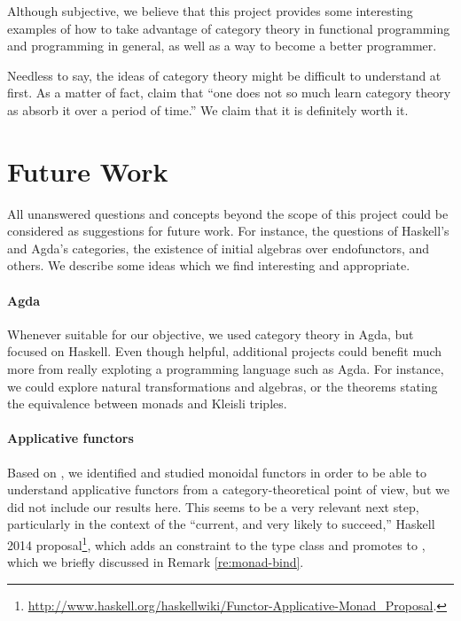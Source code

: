 Although subjective, we believe that this project provides some
interesting examples of how to take advantage of category theory in
functional programming and programming in general, as well as a way to
become a better programmer.

Needless to say, the ideas of category theory might be difficult to
understand at first. As a matter of fact,
\textcite[25]{bird-demoor-1997} claim that ``one does not so much
learn category theory as absorb it over a period of time.'' We claim
that it is definitely worth it.

\section{Future Work}

All unanswered questions and concepts beyond the scope of this project
could be considered as suggestions for future work. For instance, the
questions of Haskell's and Agda's categories, the existence of initial
algebras over endofunctors, and others. We describe some ideas which
we find interesting and appropriate.

\paragraph{Agda}

Whenever suitable for our objective, we used category theory in Agda,
but focused on Haskell. Even though helpful, additional projects could
benefit much more from really exploting a programming language such as
Agda. For instance, we could explore natural transformations and
algebras, or the theorems stating the equivalence between monads and
Kleisli triples.

\paragraph{Applicative functors}

Based on \parencite{mcbride-paterson-2008}, we identified and studied
monoidal functors in order to be able to understand applicative
functors from a category-theoretical point of view, but we did not
include our results here. This seems to be a very relevant next step,
particularly in the context of the ``current, and very likely to
succeed,'' Haskell 2014 
proposal\footnote{\url{http://www.haskell.org/haskellwiki/Functor-Applicative-Monad_Proposal}.},
which adds an  constraint to the
 type class and promotes  to
, which we briefly discussed in Remark
\ref{re:monad-bind}.

